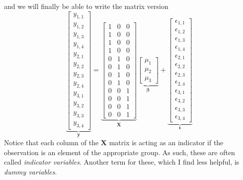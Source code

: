 \documentclass[]{book}
\theoremstyle{definition}
\theoremstyle{definition}
\theoremstyle{remark}
\begin{document}
and we will finally be able to write the matrix version \[
\underset{\boldsymbol{y}}{\underbrace{\left[\begin{array}{c}
y_{1,1}\\
y_{1,2}\\
y_{1,3}\\
y_{1,4}\\
y_{2,1}\\
y_{2,2}\\
y_{2,3}\\
y_{2,4}\\
y_{3,1}\\
y_{3,2}\\
y_{3,3}\\
y_{3,4}
\end{array}\right]}}=\underset{\mathbf{X}}{\underbrace{\left[\begin{array}{ccc}
1 & 0 & 0\\
1 & 0 & 0\\
1 & 0 & 0\\
1 & 0 & 0\\
0 & 1 & 0\\
0 & 1 & 0\\
0 & 1 & 0\\
0 & 1 & 0\\
0 & 0 & 1\\
0 & 0 & 1\\
0 & 0 & 1\\
0 & 0 & 1
\end{array}\right]}}\underset{\boldsymbol{\beta}}{\underbrace{\left[\begin{array}{c}
\mu_{1}\\
\mu_{2}\\
\mu_{3}
\end{array}\right]}}+\underset{\boldsymbol{\epsilon}}{\underbrace{\left[\begin{array}{c}
\epsilon_{1,1}\\
\epsilon_{1,2}\\
\epsilon_{1,3}\\
\epsilon_{1,4}\\
\epsilon_{2,1}\\
\epsilon_{2,2}\\
\epsilon_{2,3}\\
\epsilon_{2,4}\\
\epsilon_{3,1}\\
\epsilon_{3,2}\\
\epsilon_{3,3}\\
\epsilon_{3,4}
\end{array}\right]}}
\] \[
\] Notice that each column of the \(\boldsymbol{X}\) matrix is acting as
an indicator if the observation is an element of the appropriate group.
As such, these are often called \emph{indicator variables}. Another term
for these, which I find less helpful, is \emph{dummy variables}.
\end{document}
